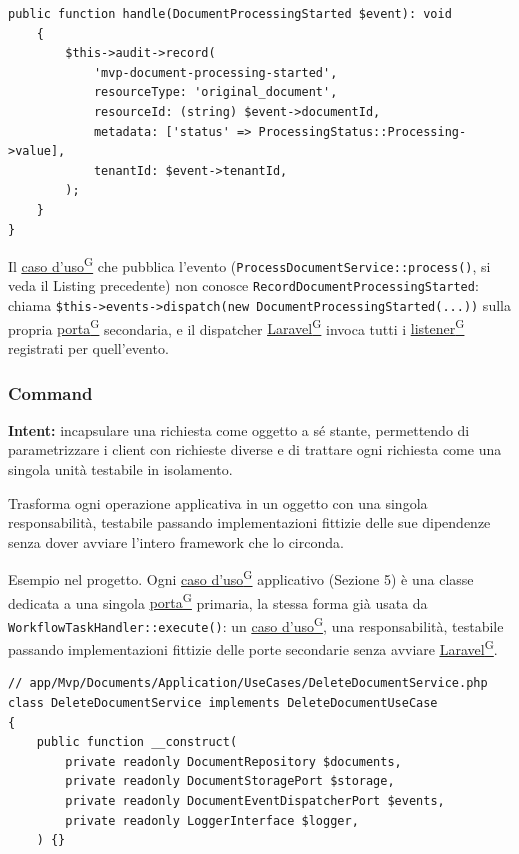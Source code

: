 \documentclass[a4paper,12pt]{article}
\providecommand{\glslink}[2]{\href{https://alittlebyte-19.github.io/Documentazione/glossario.html\#gls-#1}{\underline{#2}\textsuperscript{\scriptsize G}}}
\begin{document}
\begin{sloppypar}
\begin{lstlisting}[style=phplisting, caption={Registrazione del listener in AppServiceProvider e reazione in RecordDocumentProcessingStarted}]
    public function handle(DocumentProcessingStarted $event): void
    {
        $this->audit->record(
            'mvp-document-processing-started',
            resourceType: 'original_document',
            resourceId: (string) $event->documentId,
            metadata: ['status' => ProcessingStatus::Processing->value],
            tenantId: $event->tenantId,
        );
    }
}
\end{lstlisting}

Il \glslink{caso-d-uso-uc}{caso d'uso} che pubblica l'evento (\texttt{ProcessDocumentService::process()}, si veda il Listing precedente) non conosce \texttt{RecordDocumentProcessingStarted}: chiama \texttt{\$this->events->dispatch(new DocumentProcessingStarted(...))} sulla propria \glslink{porta}{porta} secondaria, e il dispatcher \glslink{laravel}{Laravel} invoca tutti i \glslink{listener}{listener} registrati per quell'evento.

\subsubsection{Command}

\textbf{Intent:} incapsulare una richiesta come oggetto a sé stante, permettendo di parametrizzare i client con richieste diverse e di trattare ogni richiesta come una singola unità testabile in isolamento.

Trasforma ogni operazione applicativa in un oggetto con una singola responsabilità, testabile passando implementazioni fittizie delle sue dipendenze senza dover avviare l'intero framework che lo circonda.

Esempio nel progetto. Ogni \glslink{caso-d-uso-uc}{caso d'uso} applicativo (Sezione 5) è una classe dedicata a una singola \glslink{porta}{porta} primaria, la stessa forma già usata da \texttt{WorkflowTaskHandler::execute()}: un \glslink{caso-d-uso-uc}{caso d'uso}, una responsabilità, testabile passando implementazioni fittizie delle porte secondarie senza avviare \glslink{laravel}{Laravel}.

\begin{lstlisting}[style=phplisting, caption={DeleteDocumentService -- caso d'uso applicativo con una singola porta primaria (delete())}]
// app/Mvp/Documents/Application/UseCases/DeleteDocumentService.php
class DeleteDocumentService implements DeleteDocumentUseCase
{
    public function __construct(
        private readonly DocumentRepository $documents,
        private readonly DocumentStoragePort $storage,
        private readonly DocumentEventDispatcherPort $events,
        private readonly LoggerInterface $logger,
    ) {}


\end{lstlisting}
\end{sloppypar}
\end{document}
